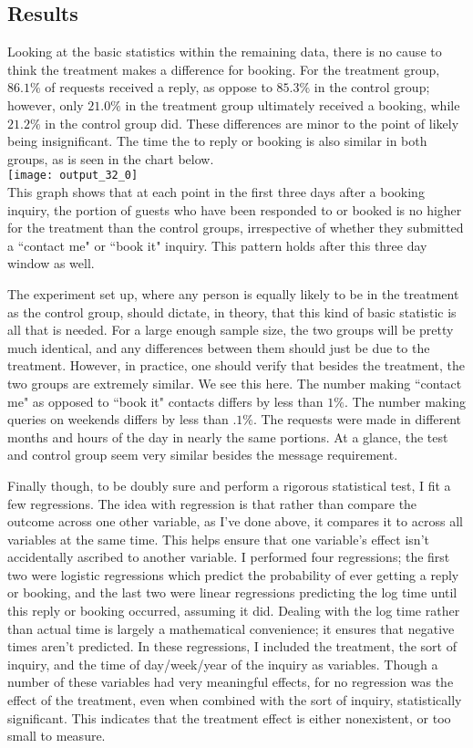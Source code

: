 \documentclass[11pt]{article}
\theoremstyle{definition}
\begin{document}
\subsection{Results}
Looking at the basic statistics within the remaining data, there is no cause to think the treatment makes a difference for booking. For the treatment group, $86.1\%$ of requests received a reply, as oppose to $85.3\%$ in the control group; however, only $21.0\%$ in the treatment group ultimately received a booking, while $21.2\%$ in the control group did. These differences are minor to the point of likely being insignificant. The time the to reply or booking is also similar in both groups, as is seen in the chart below.\\
\texttt{[image: output\_32\_0]} \\
This graph shows that at each point in the first three days after a booking inquiry, the portion of guests who have been responded to or booked is no higher for the treatment than the control groups, irrespective of whether they submitted a ``contact me" or ``book it" inquiry. This pattern holds after this three day window as well. \par
The experiment set up, where any person is equally likely to be in the treatment as the control group, should dictate, in theory, that this kind of basic statistic is all that is needed. For a large enough sample size, the two groups will be pretty much identical, and any differences between them should just be due to the treatment. However, in practice, one should verify that besides the treatment, the two groups are extremely similar. We see this here. The number making ``contact me" as opposed to ``book it" contacts differs by less than $1\%$. The number making queries on weekends differs by less than $.1\%$. The requests were made in different months and hours of the day in nearly the same portions. At a glance, the test and control group seem very similar besides the message requirement. \par
Finally though, to be doubly sure and perform a rigorous statistical test, I fit a few regressions. The idea with regression is that rather than compare the outcome across one other variable, as I've done above, it compares it to across all variables at the same time. This helps ensure that one variable's effect isn't accidentally ascribed to another variable. I performed four regressions; the first two were logistic regressions which predict the probability of ever getting a reply or booking, and the last two were linear regressions predicting the log time until this reply or booking occurred, assuming it did. Dealing with the log time rather than actual time is largely a mathematical convenience; it ensures that negative times aren't predicted. In these regressions, I included the treatment, the sort of inquiry, and the time of day/week/year of the inquiry as variables. Though a number of these variables had very meaningful effects, for no regression was the effect of the treatment, even when combined with the sort of inquiry, statistically significant. This indicates that the treatment effect is either nonexistent, or too small to measure.
\end{document}

